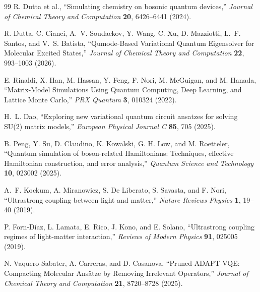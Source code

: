\documentclass[
  reprint,
  amsmath,
  amssymb,
  aps,
  pra,
  nofootinbib,
  superscriptaddress,
  floatfix
]{revtex4-2}
\begin{document}
\begin{thebibliography}{99}
R. Dutta et al.,
``Simulating chemistry on bosonic quantum devices,''
\emph{Journal of Chemical Theory and Computation} \textbf{20}, 6426--6441 (2024).

R. Dutta, C. Cianci, A.~V. Soudackov, Y. Wang, C. Xu, D. Mazziotti, L.~F. Santos, and V.~S. Batista,
``Qumode-Based Variational Quantum Eigensolver for Molecular Excited States,''
\emph{Journal of Chemical Theory and Computation} \textbf{22}, 993--1003 (2026).

E. Rinaldi, X. Han, M. Hassan, Y. Feng, F. Nori, M. McGuigan, and M. Hanada,
``Matrix-Model Simulations Using Quantum Computing, Deep Learning, and Lattice Monte Carlo,''
\emph{PRX Quantum} \textbf{3}, 010324 (2022).

H.~L. Dao,
``Exploring new variational quantum circuit ansatzes for solving SU(2) matrix models,''
\emph{European Physical Journal C} \textbf{85}, 705 (2025).

B. Peng, Y. Su, D. Claudino, K. Kowalski, G. H. Low, and M. Roetteler,
``Quantum simulation of boson-related Hamiltonians: Techniques, effective Hamiltonian construction, and error analysis,''
\emph{Quantum Science and Technology} \textbf{10}, 023002 (2025).

A.~F. Kockum, A. Miranowicz, S. De Liberato, S. Savasta, and F. Nori,
``Ultrastrong coupling between light and matter,''
\emph{Nature Reviews Physics} \textbf{1}, 19--40 (2019).

P. Forn-D{\'i}az, L. Lamata, E. Rico, J. Kono, and E. Solano,
``Ultrastrong coupling regimes of light-matter interaction,''
\emph{Reviews of Modern Physics} \textbf{91}, 025005 (2019).

N. Vaquero-Sabater, A. Carreras, and D. Casanova,
``Pruned-ADAPT-VQE: Compacting Molecular Ans\"atze by Removing Irrelevant Operators,''
\emph{Journal of Chemical Theory and Computation} \textbf{21}, 8720--8728 (2025).

\end{thebibliography}
\end{document}
